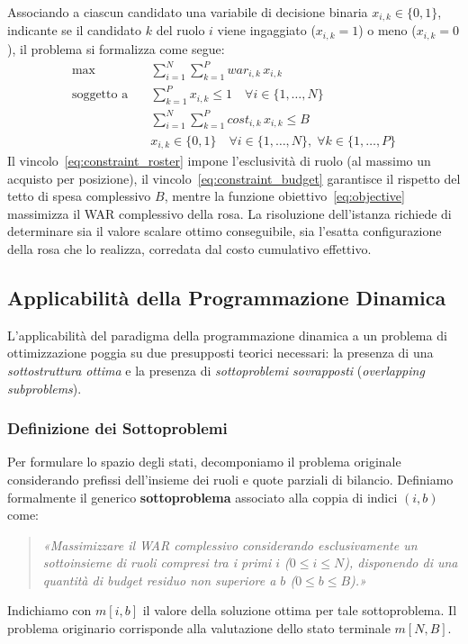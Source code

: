 Associando a ciascun candidato una variabile di decisione binaria $x_{i,k} \in \{0, 1\}$, indicante se il candidato $k$ del ruolo $i$ viene ingaggiato ($x_{i,k} = 1$) o meno ($x_{i,k} = 0$), il problema si formalizza come segue:
\begin{align}
	\max \quad              & \sum_{i=1}^N \sum_{k=1}^P \mathit{war}_{i,k} \, x_{i,k} \label{eq:objective}                                                     \\
	\text{soggetto a} \quad & \sum_{k=1}^P x_{i,k} \le 1 \quad \forall i \in \{1, \dots, N\} \label{eq:constraint_roster}                           \\
	                        & \sum_{i=1}^N \sum_{k=1}^P \mathit{cost}_{i,k} \, x_{i,k} \le B \label{eq:constraint_budget}                                       \\
	                        & x_{i,k} \in \{0, 1\} \quad \forall i \in \{1, \dots, N\}, \; \forall k \in \{1, \dots, P\} \label{eq:constraint_binary}
\end{align}
Il vincolo~\eqref{eq:constraint_roster} impone l'esclusività di ruolo (al massimo un acquisto per posizione), il vincolo~\eqref{eq:constraint_budget} garantisce il rispetto del tetto di spesa complessivo $B$, mentre la funzione obiettivo~\eqref{eq:objective} massimizza il WAR complessivo della rosa. La risoluzione dell'istanza richiede di determinare sia il valore scalare ottimo conseguibile, sia l'esatta configurazione della rosa che lo realizza, corredata dal costo cumulativo effettivo.

\subsection{Applicabilità della Programmazione Dinamica}
L'applicabilità del paradigma della programmazione dinamica a un problema di ottimizzazione poggia su due presupposti teorici necessari: la presenza di una \textit{sottostruttura ottima} e la presenza di \textit{sottoproblemi sovrapposti} (\textit{overlapping subproblems}).

\subsubsection{Definizione dei Sottoproblemi}
Per formulare lo spazio degli stati, decomponiamo il problema originale considerando prefissi dell'insieme dei ruoli e quote parziali di bilancio. Definiamo formalmente il generico \textbf{sottoproblema} associato alla coppia di indici $(i, b)$ come:
\begin{quote}
	\textit{«Massimizzare il WAR complessivo considerando esclusivamente un sottoinsieme di ruoli compresi tra i primi $i$ ($0 \le i \le N$), disponendo di una quantità di budget residuo non superiore a $b$ ($0 \le b \le B$).»}
\end{quote}
Indichiamo con $m[i, b]$ il valore della soluzione ottima per tale sottoproblema. Il problema originario corrisponde alla valutazione dello stato terminale $m[N, B]$.

